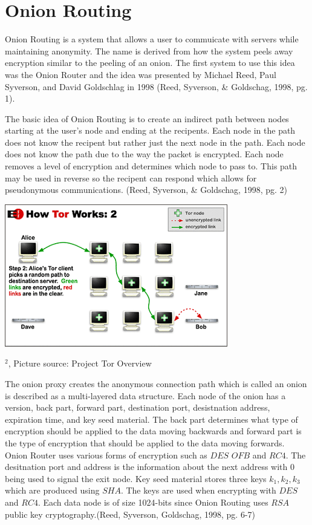 \documentclass[12pt]{article}
\def\inst#1{$^{#1}$}
\begin{document}
\section{Onion Routing}\label{}
Onion Routing is a system that allows a user to commuicate with servers while maintaining anonymity. The name is derived from how the system peels away encryption similar to the peeling of an onion. The first system to use this idea was the Onion Router and the idea was presented by Michael Reed, Paul Syverson, and David  Goldschlag in 1998 (Reed, Syverson, \& Goldschag, 1998, pg. 1). 

The basic idea of Onion Routing is to create an indirect path between nodes starting at the user's node and ending at the recipents. Each node in the path does not know the recipent but rather just the next node in the path. Each node does not know the path due to the way the packet is encrypted. Each node removes a level of encryption and determines which node to pass to. This path may be used in reverse so the recipent can respond which allows for pseudonymous communications. (Reed, Syverson, \& Goldschag, 1998, pg. 2)

\includegraphics{tor-path}
\begin{center}
{\footnotesize
\inst{2}, Picture source: Project Tor Overview}
\end{center}

The onion proxy creates the anonymous connection path which is called an onion is described as a multi-layered data structure. Each node of the onion has a version, back part, forward part, destination port, desistnation address, expiration time, and key seed material. The back part determines what type of encryption should be applied to the data moving backwards and forward part is the type of encryption that should be applied to the data moving forwards.  Onion Router uses various forms of encryption such as $DES$ $OFB$ and $RC4$. The desitnation port and address is the information about the next address with 0 being used to signal the exit node. Key seed material stores three keys $k_1, k_2, k_3$ which are produced using $SHA$. The keys are used when encrypting with $DES$ and $RC4$. Each data node is of size 1024-bits since Onion Routing uses $RSA$ public key cryptography.(Reed, Syverson, Goldschag, 1998, pg. 6-7)
\end{document}
